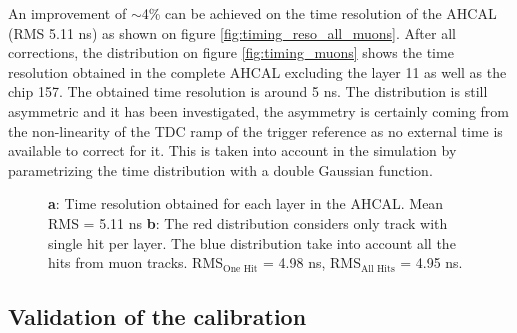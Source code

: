 \documentclass[twoside,a4paper,11pt]{article}
\begin{document}
An improvement of $\sim$4\% can be achieved on the time resolution of the AHCAL (RMS 5.11 ns) as shown on figure \ref{fig:timing_reso_all_muons}. After all corrections, the distribution on figure \ref{fig:timing_muons} shows the time resolution obtained in the complete AHCAL excluding the layer 11 as well as the chip 157. The obtained time resolution is around 5 ns. The distribution is still asymmetric and it has been investigated, the asymmetry is certainly coming from the non-linearity of the TDC ramp of the trigger reference as no external time is available to correct for it. This is taken into account in the simulation by parametrizing the time distribution with a double Gaussian function.
\begin{figure}[htbp]
	\hfill
	\caption[]{\textbf{a}: Time resolution obtained for each layer in the AHCAL. Mean RMS = 5.11 ns \textbf{b}: The red distribution considers only track with single hit per layer. The blue distribution take into account all the hits from muon tracks. RMS$_{\text{One Hit}}$ = 4.98 ns, RMS$_{\text{All Hits}}$ = 4.95 ns.}
\end{figure}
\subsection{Validation of the calibration}
\label{subsec:validation}
\end{document}
